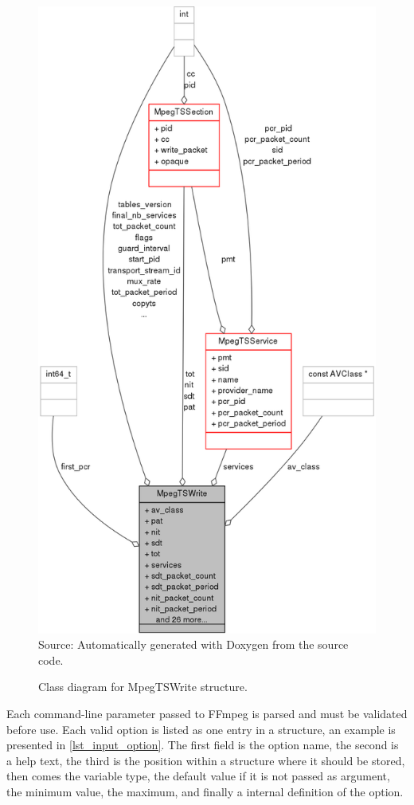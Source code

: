 \documentclass[
	12pt,				%
	openright,			%
	twoside,			%
	a4paper,			%
	brazil,
	french,				%
	english
	]{abntex2}
\begin{document}
\begin{figure}[H]
\centering
\caption{Class diagram for MpegTSWrite structure.}
\includegraphics[width=0.7\linewidth]{figuras/structMpegTSWrite__coll__graph.png}
\\Source: Automatically generated with Doxygen from the source code.
\label{fig:structMpegTSWrite__coll__graph}
\end{figure}

Each command-line parameter passed to FFmpeg is parsed and must be validated before use. Each valid option is listed as one entry in a structure, an example is presented in \autoref{lst_input_option}. The first field is the option name, the second is a help text, the third is the position within a structure where it should be stored, then comes the variable type, the default value if it is not passed as argument, the minimum value, the maximum, and finally a internal definition of the option.
\end{document}
